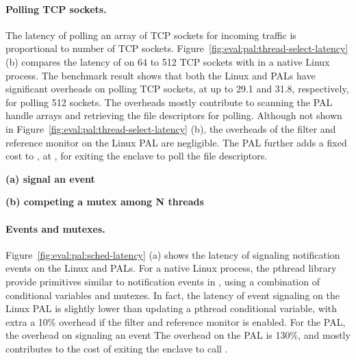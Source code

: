\paragraph{Polling TCP sockets.}
The latency of polling an array of TCP sockets for incoming traffic
is proportional to
number of TCP sockets.
Figure~\ref{fig:eval:pal:thread-select-latency} (b)
compares the latency of
 on 64 to 512 TCP sockets
with 
in a native Linux process.
The benchmark result shows that both the Linux and \sgx{} PALs
have significant overheads
on polling TCP sockets, at up to 29.1\usec{} and 31.8\usec{}, respectively, for polling 512 sockets.
The overheads mostly contribute to
scanning the PAL handle arrays and retrieving
the file descriptors for polling.
Although not shown in Figure~\ref{fig:eval:pal:thread-select-latency} (b),
the overheads
of the \seccomp{} filter and reference monitor on the Linux PAL
are negligible.
The \sgx{} PAL further adds a fixed cost to ,
at \usec{},
for exiting the enclave to poll the file descriptors.





\begin{figure*}[t!]
\centering
\footnotesize
{}
\parbox{0.49\textwidth}{\centering\bf (a) signal an event}
\parbox{0.49\textwidth}{\centering\bf (b) competing a mutex among N threads}
\caption{Latency of (a) signaling an event and (b) competing a mutex among N threads (N: 1 to 8).
Lower is better.
The comparison is between (1) pthread condition variables and mutexes on Linux; (2) Notification events and mutexes on the Linux PAL, with and without a \seccomp{} filter ({\bf +SC}) and reference monitor ({\bf +RM}); (3) the same abstractions on the \sgx{} PAL.}
\label{fig:eval:pal:sched-latency}
\end{figure*}




\paragraph{Events and mutexes.}
Figure~\ref{fig:eval:pal:sched-latency} (a)
shows the latency of signaling notification events
on the Linux and \sgx{} PALs.
For a native Linux process, the pthread library
provide primitives similar to notification events in \thehostabi{},
using a combination
of conditional variables and mutexes.
In fact, the latency of event signaling on the Linux PAL
is slightly lower than updating a pthread conditional variable,
with extra a \roughly{}10\% overhead
if the \seccomp{} filter and reference monitor is enabled.
For the \sgx{} PAL, the overhead on signaling an event
The overhead on the \sgx{} PAL
is \roughly{}130\%,
and mostly contributes to the cost of exiting the enclave to call .




